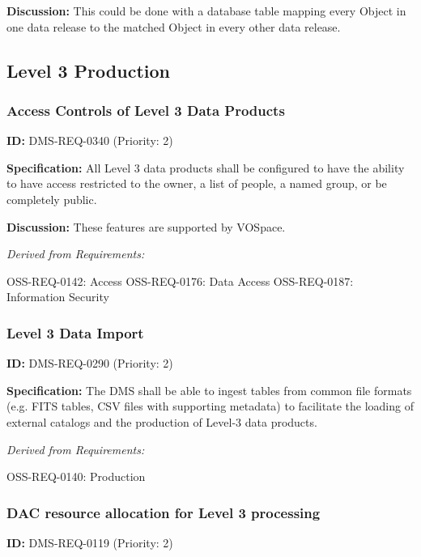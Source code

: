 \documentclass[SE,toc,lsstdraft]{lsstdoc}
\begin{document}
\textbf{Discussion:} This could be done with a database table mapping every Object in one data release to the matched Object in every other data release.

\subsection{Level 3 Production}

\subsubsection{Access Controls of Level 3 Data Products}

\label{DMS-REQ-0340}
\textbf{ID:} DMS-REQ-0340 (Priority: 2)

\textbf{Specification:} All Level 3 data products shall be configured to have the ability to have access restricted to the owner, a list of people, a named group, or be completely public.

\textbf{Discussion:} These features are supported by VOSpace.

\emph{Derived from Requirements:}

OSS-REQ-0142:
Access \newline
OSS-REQ-0176:
Data Access \newline
OSS-REQ-0187:
Information Security \newline

\subsubsection{Level 3 Data Import}

\label{DMS-REQ-0290}
\textbf{ID:} DMS-REQ-0290 (Priority: 2)

\textbf{Specification:} The DMS shall be able to ingest tables from common file formats (e.g. FITS tables, CSV files with supporting metadata) to facilitate the loading of external catalogs and the production of Level-3 data products.

\emph{Derived from Requirements:}

OSS-REQ-0140:
Production \newline

\subsubsection{DAC resource allocation for Level 3 processing}

\label{DMS-REQ-0119}
\textbf{ID:} DMS-REQ-0119 (Priority: 2)
\end{document}
